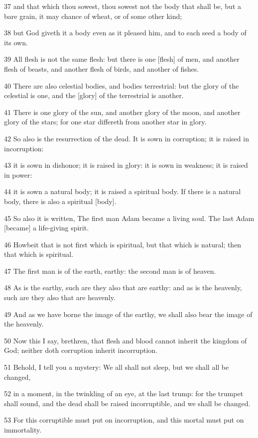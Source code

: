 \par 37 and that which thou sowest, thou sowest not the body that shall be, but a bare grain, it may chance of wheat, or of some other kind;
\par 38 but God giveth it a body even as it pleased him, and to each seed a body of its own.
\par 39 All flesh is not the same flesh: but there is one [flesh] of men, and another flesh of beasts, and another flesh of birds, and another of fishes.
\par 40 There are also celestial bodies, and bodies terrestrial: but the glory of the celestial is one, and the [glory] of the terrestrial is another.
\par 41 There is one glory of the sun, and another glory of the moon, and another glory of the stars; for one star differeth from another star in glory.
\par 42 So also is the resurrection of the dead. It is sown in corruption; it is raised in incorruption:
\par 43 it is sown in dishonor; it is raised in glory: it is sown in weakness; it is raised in power:
\par 44 it is sown a natural body; it is raised a spiritual body. If there is a natural body, there is also a spiritual [body].
\par 45 So also it is written, The first man Adam became a living soul. The last Adam [became] a life-giving spirit.
\par 46 Howbeit that is not first which is spiritual, but that which is natural; then that which is spiritual.
\par 47 The first man is of the earth, earthy: the second man is of heaven.
\par 48 As is the earthy, such are they also that are earthy: and as is the heavenly, such are they also that are heavenly.
\par 49 And as we have borne the image of the earthy, we shall also bear the image of the heavenly.
\par 50 Now this I say, brethren, that flesh and blood cannot inherit the kingdom of God; neither doth corruption inherit incorruption.
\par 51 Behold, I tell you a mystery: We all shall not sleep, but we shall all be changed,
\par 52 in a moment, in the twinkling of an eye, at the last trump: for the trumpet shall sound, and the dead shall be raised incorruptible, and we shall be changed.
\par 53 For this corruptible must put on incorruption, and this mortal must put on immortality.

